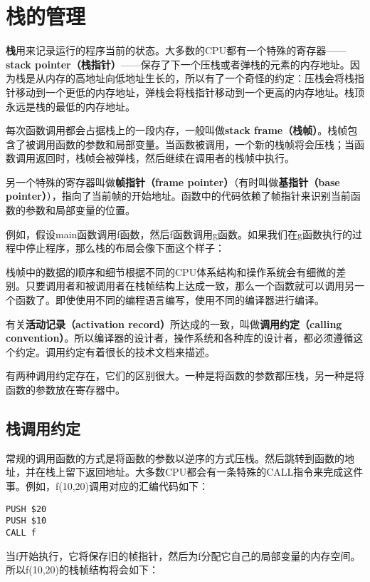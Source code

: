 \documentclass[cn,11pt,chinese]{elegantbook}
\begin{document}
\section{栈的管理}

\textbf{栈}用来记录运行的程序当前的状态。大多数的CPU都有一个特殊的寄存器——\textbf{stack pointer（栈指针）}——保存了下一个压栈或者弹栈的元素的内存地址。因为栈是从内存的高地址向低地址生长的，所以有了一个奇怪的约定：压栈会将栈指针移动到一个更低的内存地址，弹栈会将栈指针移动到一个更高的内存地址。栈顶永远是栈的最低的内存地址。

每次函数调用都会占据栈上的一段内存，一般叫做\textbf{stack frame（栈帧）}。栈帧包含了被调用函数的参数和局部变量。当函数被调用，一个新的栈帧将会压栈；当函数调用返回时，栈帧会被弹栈，然后继续在调用者的栈帧中执行。

另一个特殊的寄存器叫做\textbf{帧指针（frame pointer）}（有时叫做\textbf{基指针（base pointer）}），指向了当前帧的开始地址。函数中的代码依赖了帧指针来识别当前函数的参数和局部变量的位置。

例如，假设main函数调用f函数，然后f函数调用g函数。如果我们在g函数执行的过程中停止程序，那么栈的布局会像下面这个样子：

栈帧中的数据的顺序和细节根据不同的CPU体系结构和操作系统会有细微的差别。只要调用者和被调用者在栈帧结构上达成一致，那么一个函数就可以调用另一个函数了。即使使用不同的编程语言编写，使用不同的编译器进行编译。

有关\textbf{活动记录（activation record）}所达成的一致，叫做\textbf{调用约定（calling convention）}。所以编译器的设计者，操作系统和各种库的设计者，都必须遵循这个约定。调用约定有着很长的技术文档来描述。

有两种调用约定存在，它们的区别很大。一种是将函数的参数都压栈，另一种是将函数的参数放在寄存器中。

\subsection{栈调用约定}

常规的调用函数的方式是将函数的参数以逆序的方式压栈。然后跳转到函数的地址，并在栈上留下返回地址。大多数CPU都会有一条特殊的CALL指令来完成这件事。例如，f(10,20)调用对应的汇编代码如下：

\begin{verbatim}
PUSH $20
PUSH $10
CALL f
\end{verbatim}

当f开始执行，它将保存旧的帧指针，然后为f分配它自己的局部变量的内存空间。所以f(10,20)的栈帧结构将会如下：
\end{document}
